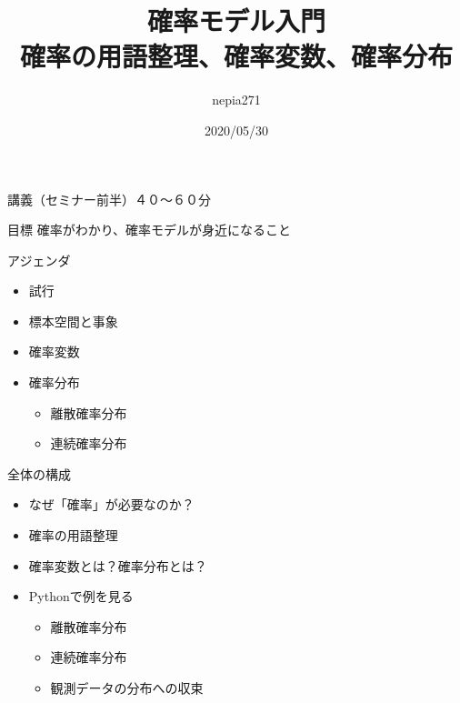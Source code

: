 \documentclass[dvipdfmx,cjk]{beamer}
\title{確率モデル入門\\確率の用語整理、確率変数、確率分布}
\author{nepia271}
\institute{Liberal Arts for Tech}
\date{2020/05/30}
\begin{document}
\begin{frame}
  \titlepage
\end{frame}




\begin{frame}{講義（セミナー前半）４０〜６０分}\pause

\begin{block}{目標}
    確率がわかり、確率モデルが身近になること
\end{block}
\pause

\vskip 1cm

\begin{block}{アジェンダ}
    \begin{itemize}
    \item 試行
    \item 標本空間と事象
    \item 確率変数
    \item 確率分布
        \begin{itemize}
        \item 離散確率分布
        \item 連続確率分布
        \end{itemize}
    \end{itemize}
\end{block}

\end{frame}


\begin{frame}{全体の構成}\pause

\begin{itemize}
    \item なぜ「確率」が必要なのか？\pause
    \item 確率の用語整理\pause
    \item 確率変数とは？確率分布とは？\pause
    \item Pythonで例を見る
        \begin{itemize}
        \item 離散確率分布
        \item 連続確率分布
        \item 観測データの分布への収束
        \end{itemize}
\end{itemize}

\end{frame}
\end{document}
